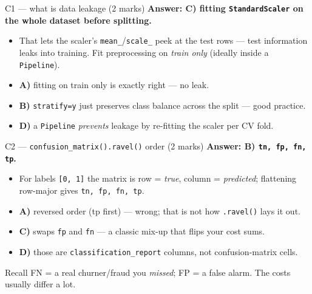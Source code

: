 \documentclass[aspectratio=169,11pt]{beamer}
\begin{document}
\begin{frame}[fragile]{C1 --- what is data leakage (2 marks)}
\textbf{Answer: C) fitting \texttt{StandardScaler} on the whole dataset before splitting.}
\begin{itemize}
  \item That lets the scaler's \texttt{mean\_}/\texttt{scale\_} \textcolor{cred}{peek at the test
        rows} --- test information leaks into training. Fit preprocessing on \emph{train only}
        (ideally inside a \texttt{Pipeline}).
  \item \textbf{A)} fitting on train only is exactly right --- no leak.
  \item \textbf{B)} \texttt{stratify=y} just preserves class balance across the split --- good practice.
  \item \textbf{D)} a \texttt{Pipeline} \emph{prevents} leakage by re-fitting the scaler per CV fold.
\end{itemize}
\end{frame}

\begin{frame}[fragile]{C2 --- \texttt{confusion\_matrix().ravel()} order (2 marks)}
\textbf{Answer: B) \texttt{tn, fp, fn, tp}.}
\begin{itemize}
  \item For labels \texttt{[0, 1]} the matrix is row = \emph{true}, column = \emph{predicted};
        flattening row-major gives \textcolor{cgreen}{\texttt{tn, fp, fn, tp}}.
  \item \textbf{A)} reversed order (tp first) --- wrong; that is not how \texttt{.ravel()} lays it out.
  \item \textbf{C)} swaps \texttt{fp} and \texttt{fn} --- a classic mix-up that flips your cost sums.
  \item \textbf{D)} those are \texttt{classification\_report} columns, not confusion-matrix cells.
\end{itemize}
\begin{block}{Recall}
\footnotesize FN = a real churner/fraud you \emph{missed}; FP = a false alarm. The costs usually differ a lot.
\end{block}
\end{frame}
\end{document}
